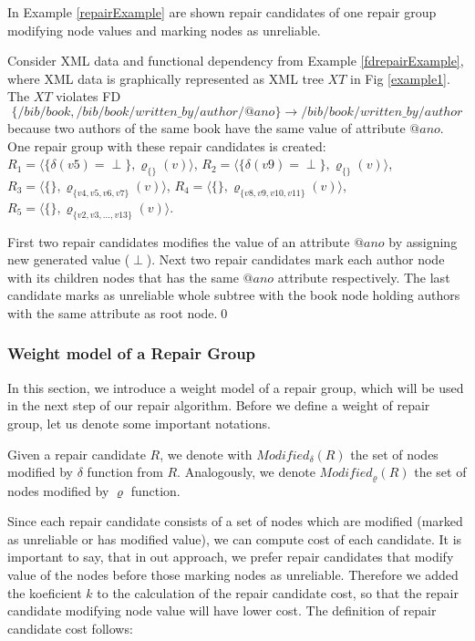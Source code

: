 In Example \ref{repairExample} are shown repair candidates of one repair group modifying node values and marking nodes as unreliable.

\begin{example}\label{repairExample}
Consider XML data and functional dependency from Example \ref{fdrepairExample}, where XML data is graphically represented as XML tree $XT$ in Fig \ref{example1}. The $XT$ violates FD $$\{/bib/book, /bib/book/written\_by/author/@ano\} \rightarrow /bib/book/written\_by/author$$ because two authors of the same book have the same value of attribute $@ano$. One repair group with these repair candidates is created: $R_1 = \langle \{\delta(v5) = \perp\},\varrho_{\{\}}(v) \rangle$, $R_2 = \langle \{\delta(v9) = \perp\},\varrho_{\{\}}(v) \rangle$, $R_3 = \langle \{\},\varrho_{\{v4,v5,v6,v7\}}(v) \rangle$, $R_4 = \langle \{\},\varrho_{\{v8,v9,v10,v11\}}(v) \rangle$, $R_5 = \langle \{\},\varrho_{\{v2,v3,\dots,v13\}}(v) \rangle$.

First two repair candidates modifies the value of an attribute $@ano$ by assigning new generated value ($\perp$). Next two repair candidates mark each author node with its children nodes that has the same $@ano$ attribute respectively. The last candidate marks as unreliable whole subtree with the book node holding authors with the same attribute as root node.\qed
\end{example}

\subsubsection{Weight model of a Repair Group}

In this section, we introduce a weight model of a repair group, which will be used in the next step of our repair algorithm. Before we define a weight of repair group, let us denote some important notations.

Given a repair candidate $R$, we denote with $Modified_\delta(R)$ the set of nodes modified by $\delta$ function from $R$. Analogously, we denote $Modified_\varrho(R)$ the set of nodes modified by $\varrho$ function.


Since each repair candidate consists of a set of nodes which are modified (marked as unreliable or has modified value), we can compute cost of each candidate. It is important to say, that in out approach, we prefer repair candidates that modify value of the nodes before those marking nodes as unreliable. Therefore we added the koeficient $k$ to the calculation of the repair candidate cost, so that the repair candidate modifying node value will have lower cost. The definition of repair candidate cost follows:

